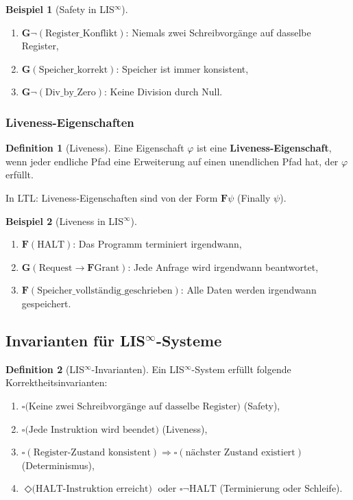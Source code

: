 \documentclass[a4paper,12pt]{article}
\theoremstyle{definition}
\newtheorem{definition}{Definition}
\newtheorem{beispiel}{Beispiel}
\begin{document}
\begin{beispiel}[Safety in LIS$^{\infty}$]
	\begin{enumerate}
		\item $\mathbf{G}\neg(\text{Register\_Konflikt})$: Niemals zwei Schreibvorgänge auf dasselbe Register,
		\item $\mathbf{G}(\text{Speicher\_korrekt})$: Speicher ist immer konsistent,
		\item $\mathbf{G}\neg(\text{Div\_by\_Zero})$: Keine Division durch Null.
	\end{enumerate}
\end{beispiel}

\subsubsection{Liveness-Eigenschaften}

\begin{definition}[Liveness]
	\label{def:liveness}
	Eine Eigenschaft $\varphi$ ist eine \textbf{Liveness-Eigenschaft}, wenn jeder endliche Pfad eine Erweiterung auf einen unendlichen Pfad hat, der $\varphi$ erfüllt.
	
	In LTL: Liveness-Eigenschaften sind von der Form $\mathbf{F}\psi$ (Finally $\psi$).
\end{definition}

\begin{beispiel}[Liveness in LIS$^{\infty}$]
	\begin{enumerate}
		\item $\mathbf{F}(\text{HALT})$: Das Programm terminiert irgendwann,
		\item $\mathbf{G}(\text{Request} \to \mathbf{F}\text{Grant})$: Jede Anfrage wird irgendwann beantwortet,
		\item $\mathbf{F}(\text{Speicher\_vollständig\_geschrieben})$: Alle Daten werden irgendwann gespeichert.
	\end{enumerate}
\end{beispiel}

\subsection{Invarianten für LIS$^{\infty}$-Systeme}

\begin{definition}[LIS$^{\infty}$-Invarianten]
	\label{def:lis_invarianten}
	Ein LIS$^{\infty}$-System erfüllt folgende Korrektheitsinvarianten:
	\begin{enumerate}
		\item $\square \text{(Keine zwei Schreibvorgänge auf dasselbe Register)}$ (Safety),
		\item $\square \text{(Jede Instruktion wird beendet)}$ (Liveness),
		\item $\square (\text{Register-Zustand konsistent}) \Rightarrow \square (\text{nächster Zustand existiert})$ (Determinismus),
		\item $\Diamond \text{(HALT-Instruktion erreicht)}$ oder $\square \neg \text{HALT}$ (Terminierung oder Schleife).
	\end{enumerate}
\end{definition}
\end{document}
